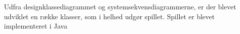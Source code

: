 Udfra designklassediagrammet og systemsekvensdiagrammerne, er der blevet udviklet en række klasser, som i helhed udgør spillet. Spillet er blevet implementeret i Java 















